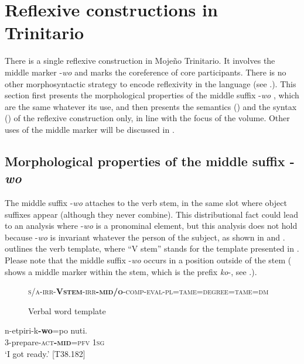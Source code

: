 \documentclass[output=paper]{langscibook}
\begin{document}
\section{Reflexive constructions in Trinitario}
\label{sec:Rose:3}

There is a single reflexive construction in Mojeño Trinitario. It involves the middle marker -\textit{wo} and marks the coreference of core participants. There is no other morphosyntactic strategy to encode reflexivity in the language (see .). This section first presents the morphological properties of the middle suffix -\textit{wo} , which are the same whatever its use, and then presents the semantics () and the syntax () of the reflexive construction only, in line with the focus of the volume. Other uses of the middle marker will be discussed in .


\subsection{Morphological properties of the middle suffix -\textit{wo}}
\label{sec:Rose:3.1}

The middle suffix -\textit{wo} attaches to the verb stem, in the same slot where object suffixes appear (although they never combine). This distributional fact could lead to an analysis where -\textit{wo} is a pronominal element, but this analysis does not hold because -\textit{wo} is invariant whatever the person of the subject, as shown in  and .  outlines the verb template, where “V stem” stands for the template presented in . Please note that the middle suffix -\textit{wo} occurs in a position outside of the stem ( shows a middle marker within the stem, which is the prefix \textit{ko}-, see .).

\begin{figure}

\caption{\label{fig:Rose:3}Verbal word template}

\textsc{s/a}-\textsc{irr-}\textbf{\textsc{Vstem}}\textsc{-irr}\textbf{\textsc{-mid}}\textbf{/\textsc{o}}\textsc{-comp-eval}-\textsc{pl=tame=degree=tame=dm}
\end{figure}

\ea
\label{ex:Rose:9}
\gll n-etpiri-k\textbf{-wo}=po nuti. \\
3-prepare-\textsc{act\textbf{-mid}=pfv} \textsc{1sg}\\
\glt ‘I got ready.’ [T38.182]
\z
\end{document}

